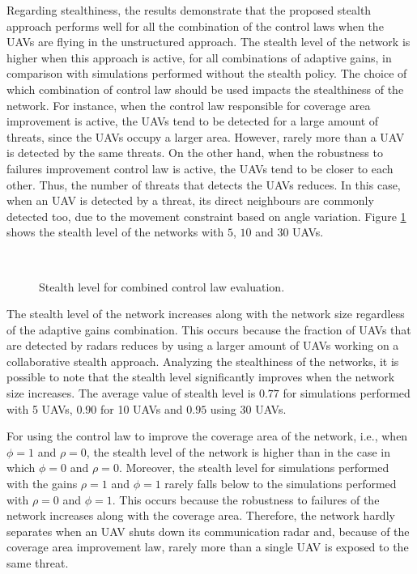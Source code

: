 Regarding stealthiness, the results demonstrate that the proposed stealth approach performs well for all the combination of the control laws when the UAVs are flying in the unstructured approach. The stealth level of the network is higher when this approach is active, for all combinations of adaptive gains, in comparison with simulations performed without the stealth policy. 
The choice of which combination of control law should be used impacts the stealthiness of the network. For instance, when the control law responsible for coverage area improvement is active, the UAVs tend to be detected for a large amount of threats, since the UAVs occupy a larger area. However, rarely more than a UAV is detected by the same threats. On the other hand, when the robustness to failures improvement control law is active, the UAVs tend to be closer to each other. Thus, the number of threats that detects the UAVs reduces. In this case, when an UAV is detected by a threat, its direct neighbours are commonly detected too, due to the movement constraint based on angle variation. Figure \ref{fig:unstructuredStealthLevelRadarOn} shows the stealth level of the networks with $5$, $10$ and $30$ UAVs.

\begin{figure}[hbt!]
      \centering            
         \\ \centering
      \caption{Stealth level for combined control law evaluation.}
      \label{fig:unstructuredStealthLevelRadarOn}
\end{figure}

The stealth level of the network increases along with the network size regardless of the adaptive gains combination. This occurs because the fraction of UAVs that are detected by radars reduces by using a larger amount of UAVs working on a collaborative stealth approach. Analyzing the stealthiness of the networks, it is possible to note that the stealth level significantly improves when the network size increases. The average value of stealth level is $0.77$ for simulations performed with 5 UAVs, $0.90$ for 10 UAVs and $0.95$ using 30 UAVs.

For using the control law to improve the coverage area of the network, i.e., when $\phi=1$ and $\rho=0$, the stealth level of the network is higher than in the case in which $\phi=0$ and $\rho=0$. Moreover, the stealth level for simulations performed with the gains $\rho=1$ and $\phi=1$ rarely falls below to the simulations performed with $\rho=0$ and $\phi=1$. This occurs because the robustness to failures of the network increases along with the coverage area. Therefore, the network hardly separates when an UAV shuts down its communication radar and, because of the coverage area improvement law, rarely more than a single UAV is exposed to the same threat. 

